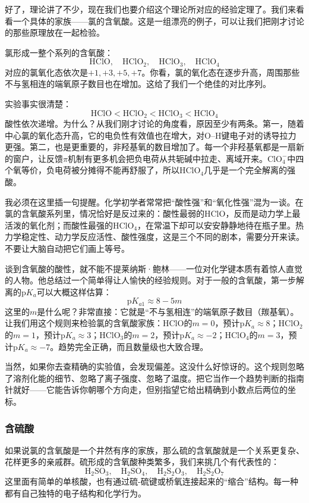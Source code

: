 \documentclass[UTF8]{ctexbook}
\begin{document}
好了，理论讲了不少，现在我们也要介绍这个理论所对应的经验定理了。我们来看看一个具体的家族——氯的含氧酸。这是一组漂亮的例子，可以让我们把刚才讨论的那些原理放在一起检验。

氯形成一整个系列的含氧酸：
$$
\mathrm{HClO,\quad HClO_2,\quad HClO_3,\quad HClO_4}
$$
对应的氯氧化态依次是$+1,+3,+5,+7$。你看，氯的氧化态在逐步升高，周围那些不与氢相连的端氧原子数目也在增加。这给了我们一个绝佳的对比序列。

实验事实很清楚：
$$
\mathrm{HClO < HClO_2 < HClO_3 < HClO_4}
$$
酸性依次递增。为什么？从我们刚才讨论的角度看，原因至少有两条。第一，随着中心氯的氧化态升高，它的电负性有效值也在增大，对$\mathrm{O}$--$\mathrm{H}$键电子对的诱导拉力更强。第二，也是更重要的，非羟基氧的数目增加了。每一个非羟基氧都是一扇新的窗户，让反馈$\pi$机制有更多机会把负电荷从共轭碱中拉走、离域开来。$\mathrm{ClO_4^-}$中四个氧等价，负电荷被分摊得不能再舒服了，所以$\mathrm{HClO_4}$几乎是一个完全解离的强酸。

我必须在这里插一句提醒。化学初学者常常把“酸性强”和“氧化性强”混为一谈。在氯的含氧酸系列里，情况恰好是反过来的：酸性最弱的$\mathrm{HClO}$，反而是动力学上最活泼的氧化剂；而酸性最强的$\mathrm{HClO_4}$，在常温下却可以安安静静地待在瓶子里。热力学稳定性、动力学反应活性、酸性强度，这是三个不同的剧本，需要分开来读。不要让大脑自动把它们画上等号。

谈到含氧酸的酸性，就不能不提莱纳斯·鲍林——一位对化学键本质有着惊人直觉的人物。他总结过一个简单得让人愉快的经验规则。对于一般的含氧酸，第一步解离的$\mathrm{p}K_a$可以大概这样估算：
$$
\mathrm{p}K_{a1}\approx 8-5m
$$
这里的$m$是什么呢？非常直接：它就是“不与氢相连”的端氧原子数目（羰基氧）。让我们用这个规则来检验氯的含氧酸家族：$\mathrm{HClO}$的$m=0$，预计$\mathrm{p}K_a\approx 8$；$\mathrm{HClO_2}$的$m=1$，预计$\mathrm{p}K_a\approx 3$；$\mathrm{HClO_3}$的$m=2$，预计$\mathrm{p}K_a\approx -2$；$\mathrm{HClO_4}$的$m=3$，预计$\mathrm{p}K_a\approx -7$。趋势完全正确，而且数量级也大致合理。

当然，如果你去查精确的实验值，会发现偏差。这没什么好惊讶的。这个规则忽略了溶剂化能的细节、忽略了离子强度、忽略了温度。把它当作一个趋势判断的指南针就好——它能告诉你朝哪个方向走，但别指望它给出精确到小数点后两位的坐标。

\subsubsection{含硫酸}

如果说氯的含氧酸是一个井然有序的家族，那么硫的含氧酸就是一个关系更复杂、花样更多的亲戚群。硫形成的含氧酸种类繁多，我们来挑几个有代表性的：
$$
\mathrm{H_2SO_3,\quad H_2SO_4,\quad H_2S_2O_3,\quad H_2S_2O_7}
$$
这里面有简单的单核酸，也有通过硫-硫键或桥氧连接起来的“缩合”结构。每一种都有自己独特的电子结构和化学行为。
\end{document}

